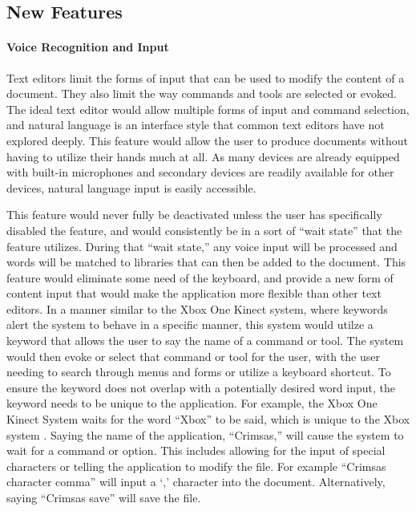 \documentclass[11pt, oneside]{article}
\begin{document}
\subsection{New Features}

\paragraph{Voice Recognition and Input}
Text editors limit the forms of input that can be used to modify the content of a document. They also limit the way commands and tools are selected or evoked. The ideal text editor would allow multiple forms of input and command selection, and natural language is an interface style that common text editors have not explored deeply. This feature would allow the user to produce documents without having to utilize their hands much at all. As many devices are already equipped with built-in microphones and secondary devices are readily available for other devices, natural language input is easily accessible. 

This feature would never fully be deactivated unless the user has specifically disabled the feature, and would consistently be in a sort of ``wait state'' that the feature utilizes. During that ``wait state,'' any voice input will be processed and words will be matched to libraries that can then be added to the document. This feature would eliminate some need of the keyboard, and provide a new form of content input that would make the application more flexible than other text editors. In a manner similar to the Xbox One Kinect system, where keywords alert the system to behave in a specific manner, this system would utilze a keyword that allows the user to say the name of a command or tool. The system would then evoke or select that command or tool for the user, with the user needing to search through menus and forms or utilize a keyboard shortcut. To ensure the keyword does not overlap with a potentially desired word input, the keyword needs to be unique to the application. For example, the Xbox One Kinect System waits for the word ``Xbox'' to be said, which is unique to the Xbox system \cite{Xbox}. Saying the name of the application, ``Crimsas,'' will cause the system to wait for a command or option. This includes allowing for the input of special characters or telling the application to modify the file. For example ``Crimsas character comma'' will input a `,' character into the document. Alternatively, saying ``Crimsas save'' will save the file.
\end{document}
